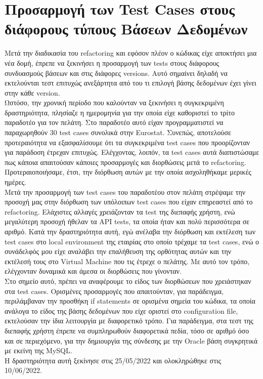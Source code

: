 \section*{Προσαρμογή των Test Cases στους διάφορους τύπους Βάσεων Δεδομένων}
Μετά την διαδικασία του refactoring και εφόσον πλέον ο κώδικας είχε αποκτήσει μια νέα δομή, έπρεπε να ξεκινήσει η προσαρμογή των tests στους διάφορους συνδυασμούς βάσεων και στις διάφορες versions. Αυτό σημαίνει δηλαδή 
να εκτελούνται τεστ επιτυχώς ανεξάρτητα από του τι επιλογή βάσης δεδομένων έχει γίνει στην κάθε version. \\

Ωστόσο, την χρονική περίοδο που καλούνταν να ξεκινήσει η συγκεκριμένη δραστηριότητα, πλησίαζε η ημερομηνία για την οποία είχε καθοριστεί το τρίτο παραδοτέο για τον πελάτη. Στο παραδοτέο αυτό είχαν προγραμματιστεί 
να παραχωρηθούν 30 test cases συνολικά στην Eurostat. Συνεπώς, αποτελούσε προτεραιότητα να εξασφαλίσουμε ότι τα συγκεκριμένα test cases που προορίζονταν για παράδοση έτρεχαν επιτυχώς. Ελέγχοντας, λοιπόν, τα test cases 
αυτά διαπιστώσαμε πως κάποια απαιτούσαν κάποιες προσαρμογές και διορθώσεις μετά το refactoring. Προτεραιοποιήσαμε, έτσι, την διόρθωση αυτών με την οποία ασχοληθήκαμε μερικές ημέρες.\\

Μετά την προσαρμογή των test cases του παραδοτέου στον πελάτη στρέψαμε την προσοχή μας στην διόρθωση των υπόλοιπων test cases που είχαν επηρεαστεί από το refactoring. Ελάχιστες αλλαγές χρειάζονταν τα 
test της διεπαφής χρήστη, ενώ μεγαλύτερη προσοχή ήθελαν τα API tests, τα οποία ήταν και πολύ περισσότερα σε αριθμό. Κατά την δραστηριότητα αυτή, εγώ ανέλαβα την διόρθωση και εκτέλεση των test cases στο local 
environment της εταιρίας στο οποίο τρέχαμε τα test cases, ενώ ο συνάδελφός μου είχε αναλάβει την επαλήθευση της ορθότητας αυτών και την εκτέλεσή τους στο Virtual Machine που τις έτρεχε ο πελάτης. Με αυτό τον 
τρόπο, ελέγχονταν δυναμικά και άμεσα οι διορθώσεις που γίνονταν.\\

Στο σημείο αυτό, πρέπει να αναφέρουμε το είδος των διορθώσεων που χρειάστηκαν στα test cases. Ορισμένες προσαρμογές που απαιτούνταν, για παράδειγμα, περιλάμβαναν την προσθήκη if statements σε ορισμένα σημεία του 
κώδικα, τα οποία ανάλογα το είδος της βάσης δεδομένων που είχε οριστεί στο configuration file, εκτελούσαν την ίδια λειτουργία με διαφορετικό τρόπο. Για παράδειγμα, στα τεστ της διεπαφής χρήστη έπρεπε να συμπληρωθούν 
διαφορετικά πεδία, τόσο σε αριθμό όσο και σε περιεχόμενο, για την δημιουργία της σύνδεσης με την Oracle βάση συγκρητικά με εκείνη της MySQL.\\
Η δραστηριότητα αυτή ξεκίνησε στις 25/05/2022 και ολοκληρώθηκε στις 10/06/2022.

